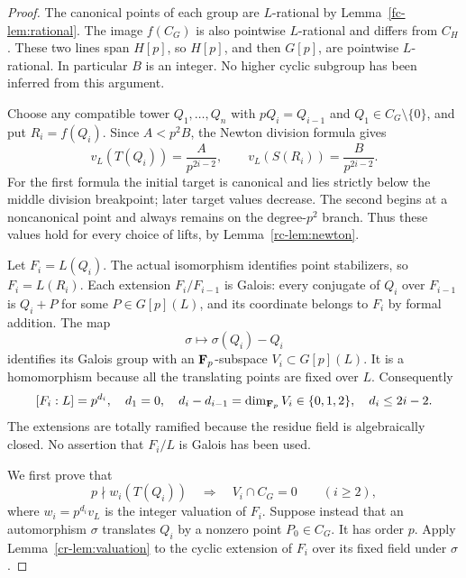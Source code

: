 \begin{proof}
The canonical points of each group are $L$-rational by
Lemma~\ref{fc-lem:rational}. The image $f(C_G)$ is also pointwise
$L$-rational and differs from $C_H$. These two lines span $H[p]$,
so $H[p]$, and then $G[p]$, are pointwise $L$-rational. In
particular $B$ is an integer. No higher cyclic subgroup has been
inferred from this argument.

Choose any compatible tower $Q_1,\ldots,Q_n$ with
$pQ_i=Q_{i-1}$ and $Q_1\in C_G\setminus\{0\}$, and put
$R_i=f(Q_i)$. Since $A<p^2B$, the Newton division formula gives
\begin{equation}\label{eq:proper-point-values}
 v_L(T(Q_i))=\frac{A}{p^{2i-2}},\qquad
 v_L(S(R_i))=\frac{B}{p^{2i-2}}.
\end{equation}
For the first formula the initial target is canonical and lies
strictly below the middle division breakpoint; later target
values decrease. The second begins at a noncanonical point and
always remains on the degree-$p^2$ branch. Thus these values hold
for every choice of lifts, by Lemma~\ref{rc-lem:newton}.

Let $F_i=L(Q_i)$. The actual isomorphism identifies point
stabilizers, so $F_i=L(R_i)$. Each extension $F_i/F_{i-1}$ is
Galois: every conjugate of $Q_i$ over $F_{i-1}$ is $Q_i+P$ for
some $P\in G[p](L)$, and its coordinate belongs to $F_i$ by
formal addition. The map
\[
 \sigma\longmapsto\sigma(Q_i)-Q_i
\]
identifies its Galois group with an $\mathbf F_p$-subspace
$V_i\subset G[p](L)$. It is a homomorphism because all the
translating points are fixed over $L$. Consequently
\[
 [F_i:L]=p^{d_i},\quad d_1=0,\quad
 d_i-d_{i-1}=\dim_{\mathbf F_p}V_i\in\{0,1,2\},\quad d_i\le2i-2.
\]
The extensions are totally ramified because the residue field
is algebraically closed. No assertion that $F_i/L$ is Galois
has been used.

We first prove that
\begin{equation}\label{eq:prime-coordinate-no-canonical-translation}
 p\nmid w_i(T(Q_i))\quad\Longrightarrow\quad
 V_i\cap C_G=0\qquad(i\ge2),
\end{equation}
where $w_i=p^{d_i}v_L$ is the integer valuation of $F_i$.
Suppose instead that an automorphism $\sigma$ translates $Q_i$
by a nonzero point $P_0\in C_G$. It has order $p$. Apply
Lemma~\ref{cr-lem:valuation} to the cyclic extension of $F_i$
over its fixed field under $\sigma$.


\end{proof}
